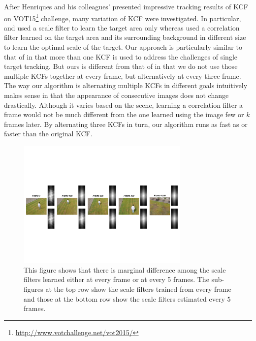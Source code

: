 \documentclass{bmvc2k}
\begin{document}
After Henriques and his colleagues' presented impressive tracking 
results of KCF \cite{henriques2015high} on
VOT15\footnote{\url{http://www.votchallenge.net/vot2015/}} challenge,
many variation of KCF were investigated. In particular,
\cite{ma2015long} and \cite{danelljan2014accurate} used a scale filter
to learn the target area only whereas \cite{li2014scale,
  bibi2015multi, tang2015multi} used a correlation filter learned on
the target area and its surrounding background in different size to
learn the optimal scale of the target. Our approach is particularly
similar to that of \cite{ma2015long} in that more than one KCF is used
to address the challenges of single target tracking. But ours is
different from that of \cite{ma2015long} in that we do not use those
multiple KCFs together at every frame, but alternatively at every
three frame. The way our algorithm is alternating multiple KCFs in
different goals intuitively makes sense in that the appearance of
consecutive images does not change drastically. Although it varies
based on the scene, learning a correlation filter a frame would not be
much different from the one learned using the image few or $k$ frames
later. By alternating three KCFs in turn, our algorithm runs as fast
as or faster than the original KCF. 
\begin{figure}[!h]
\centering
\includegraphics[width=0.75\textwidth]{figures/LearnedFilterComparison.pdf}
\caption{This figure shows that there is marginal difference among the
  scale filters learned either at every frame or at every 5
  frames. The sub-figures at the top row show the scale filters
  trained from every frame and those at the bottom row show the scale
  filters estimated every 5 frames.}
\label{fig:Filters_Comparison}
\end{figure}
\end{document}
